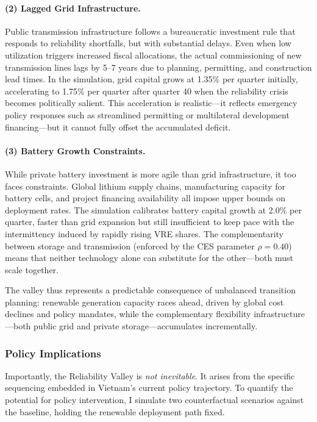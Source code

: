 \documentclass[12pt, a4paper]{article}
\begin{document}
\paragraph{(2) Lagged Grid Infrastructure.} Public transmission infrastructure follows a bureaucratic investment rule that responds to reliability shortfalls, but with substantial delays. Even when low utilization triggers increased fiscal allocations, the actual commissioning of new transmission lines lags by 5--7 years due to planning, permitting, and construction lead times. In the simulation, grid capital grows at 1.35\% per quarter initially, accelerating to 1.75\% per quarter after quarter 40 when the reliability crisis becomes politically salient. This acceleration is realistic---it reflects emergency policy responses such as streamlined permitting or multilateral development financing---but it cannot fully offset the accumulated deficit.

\paragraph{(3) Battery Growth Constraints.} While private battery investment is more agile than grid infrastructure, it too faces constraints. Global lithium supply chains, manufacturing capacity for battery cells, and project financing availability all impose upper bounds on deployment rates. The simulation calibrates battery capital growth at 2.0\% per quarter, faster than grid expansion but still insufficient to keep pace with the intermittency induced by rapidly rising VRE shares. The complementarity between storage and transmission (enforced by the CES parameter $\rho = 0.40$) means that neither technology alone can substitute for the other---both must scale together.

The valley thus represents a predictable consequence of unbalanced transition planning: renewable generation capacity races ahead, driven by global cost declines and policy mandates, while the complementary flexibility infrastructure---both public grid and private storage---accumulates incrementally.

\subsubsection{Policy Implications}

Importantly, the Reliability Valley is \textit{not inevitable}. It arises from the specific sequencing embedded in Vietnam's current policy trajectory. To quantify the potential for policy intervention, I simulate two counterfactual scenarios against the baseline, holding the renewable deployment path fixed.
\end{document}

